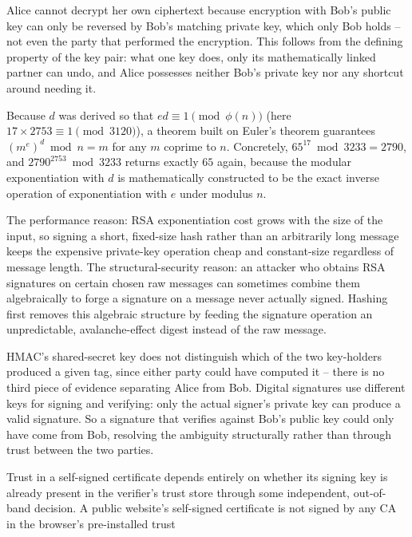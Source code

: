 \begin{answerkey}
\item Alice cannot decrypt her own ciphertext because encryption with Bob's public key can only be
reversed by Bob's matching private key, which only Bob holds -- not even the party that performed the
encryption. This follows from the defining property of the key pair: what one key does, only its
mathematically linked partner can undo, and Alice possesses neither Bob's private key nor any
shortcut around needing it.
\item Because $d$ was derived so that $ed \equiv 1 \pmod{\phi(n)}$ (here $17 \times 2753 \equiv 1
\pmod{3120}$), a theorem built on Euler's theorem guarantees $(m^e)^d \bmod n = m$ for any $m$
coprime to $n$. Concretely, $65^{17} \bmod 3233 = 2790$, and $2790^{2753} \bmod 3233$ returns exactly
$65$ again, because the modular exponentiation with $d$ is mathematically constructed to be the
exact inverse operation of exponentiation with $e$ under modulus $n$.
\item The performance reason: RSA exponentiation cost grows with the size of the input, so signing a
short, fixed-size hash rather than an arbitrarily long message keeps the expensive private-key
operation cheap and constant-size regardless of message length. The structural-security reason: an
attacker who obtains RSA signatures on certain chosen raw messages can sometimes combine them
algebraically to forge a signature on a message never actually signed. Hashing first removes this
algebraic structure by feeding the signature operation an unpredictable, avalanche-effect digest
instead of the raw message.
\item HMAC's shared-secret key does not distinguish which of the two key-holders produced a given
tag, since either party could have computed it -- there is no third piece of evidence separating
Alice from Bob. Digital signatures use different keys for signing and verifying: only the actual
signer's private key can produce a valid signature. So a signature that verifies against Bob's
public key could only have come from Bob, resolving the ambiguity structurally rather than through
trust between the two parties.
\item Trust in a self-signed certificate depends entirely on whether its signing key is already
present in the verifier's trust store through some independent, out-of-band decision. A public
website's self-signed certificate is not signed by any CA in the browser's pre-installed trust

\end{answerkey}
